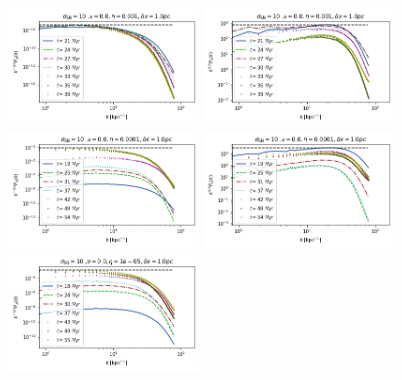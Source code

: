 \documentclass[iop,apj,numberedappendix,twocolappendix]{emulateapj}
\begin{document}
\begin{figure}
\centering
\includegraphics[trim=0.0cm 0.00cm 0.0cm 0.0cm,clip=true,width=0.45\textwidth]{csc_figs/1pcPm0e-3_0Bpower.png}
\includegraphics[trim=0.0cm 0.00cm 0.0cm 0.0cm,clip=true,width=0.45\textwidth]{csc_figs/1pcPm0e-3_0kpower.png}
\includegraphics[trim=0.0cm 0.00cm 0.0cm 0.0cm,clip=true,width=0.45\textwidth]{csc_figs/1pcPm0e-4_0Bpower.png}
\includegraphics[trim=0.0cm 0.00cm 0.0cm 0.0cm,clip=true,width=0.45\textwidth]{csc_figs/1pcPm0e-4_0kpower.png}
\includegraphics[trim=0.0cm 0.00cm 0.0cm 0.0cm,clip=true,width=0.45\textwidth]{csc_figs/1pcPm0e-5_0Bpower.png}

\end{figure}
\end{document}

